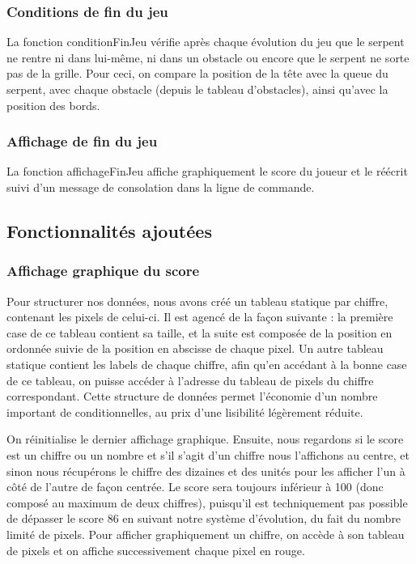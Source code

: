 \documentclass[a4paper]{article}
\begin{document}
\subsubsection*{Conditions de fin du jeu}
La fonction conditionFinJeu vérifie après chaque évolution du jeu que le serpent ne rentre ni dans lui-même, ni dans un obstacle ou encore que le serpent ne sorte pas de 
la grille. Pour ceci, on compare la position de la tête avec la queue du serpent, avec chaque obstacle (depuis le tableau d'obstacles), ainsi qu'avec la position des bords.

\subsubsection*{Affichage de fin du jeu}
La fonction affichageFinJeu affiche graphiquement le score du joueur et le réécrit suivi d'un message de consolation dans la ligne de commande.

\subsection{Fonctionnalités ajoutées}

\subsubsection*{Affichage graphique du score}
Pour structurer nos données, nous avons créé un tableau statique par chiffre, contenant les pixels de celui-ci. Il est agencé de la façon suivante : la première case de ce 
tableau contient sa taille, et la suite est composée de la position en ordonnée suivie de la position en abscisse de chaque pixel.
Un autre tableau statique contient les labels de chaque chiffre, afin qu'en accédant à la bonne case de ce tableau, on puisse accéder à l'adresse du tableau de pixels du 
chiffre correspondant. Cette structure de données permet l'économie d'un nombre important de conditionnelles, au prix d'une lisibilité légèrement réduite.

On réinitialise le dernier affichage graphique. Ensuite, nous regardons si le score est un chiffre ou un nombre et s'il s'agit d'un chiffre nous l'affichons au centre, 
et sinon nous récupérons le chiffre des dizaines et des unités pour les afficher l'un à côté de l'autre de façon centrée. 
Le score sera toujours inférieur à 100 (donc composé au maximum de deux chiffres), puisqu'il est techniquement pas possible de dépasser le score 86 en suivant
notre système d'évolution, du fait du nombre limité de pixels.
Pour afficher graphiquement un chiffre, on accède à son tableau de pixels et on affiche successivement chaque pixel en rouge.
\end{document}
